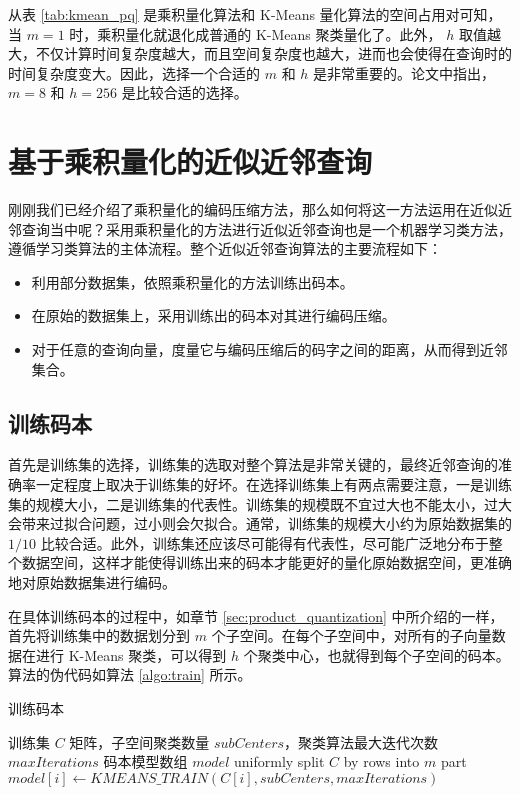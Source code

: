 从表 \ref{tab:kmean_pq} 是乘积量化算法和 K-Means 量化算法的空间占用对可知，当 $m = 1$ 时，乘积量化就退化成普通的 K-Means 聚类量化了。此外， $h$ 取值越大，不仅计算时间复杂度越大，而且空间复杂度也越大，进而也会使得在查询时的时间复杂度变大。因此，选择一个合适的 $m$ 和 $h$ 是非常重要的。论文\cite{Herve_PQ}中指出，$ m = 8 $ 和 $h = 256$ 是比较合适的选择。
\section{基于乘积量化的近似近邻查询}
刚刚我们已经介绍了乘积量化的编码压缩方法，那么如何将这一方法运用在近似近邻查询当中呢？采用乘积量化的方法进行近似近邻查询也是一个机器学习类方法，遵循学习类算法的主体流程。整个近似近邻查询算法的主要流程如下：
\begin{itemize}
\item 利用部分数据集，依照乘积量化的方法训练出码本。
\item 在原始的数据集上，采用训练出的码本对其进行编码压缩。
\item 对于任意的查询向量，度量它与编码压缩后的码字之间的距离，从而得到近邻集合。
\end{itemize}
\subsection{训练码本}
首先是训练集的选择，训练集的选取对整个算法是非常关键的，最终近邻查询的准确率一定程度上取决于训练集的好坏。在选择训练集上有两点需要注意，一是训练集的规模大小，二是训练集的代表性。训练集的规模既不宜过大也不能太小，过大会带来过拟合问题，过小则会欠拟合。通常，训练集的规模大小约为原始数据集的 $1/10$ 比较合适。此外，训练集还应该尽可能得有代表性，尽可能广泛地分布于整个数据空间，这样才能使得训练出来的码本才能更好的量化原始数据空间，更准确地对原始数据集进行编码。

在具体训练码本的过程中，如章节 \ref{sec:product_quantization} 中所介绍的一样，首先将训练集中的数据划分到 $m$ 个子空间。在每个子空间中，对所有的子向量数据在进行 K-Means 聚类，可以得到 $h$ 个聚类中心，也就得到每个子空间的码本。算法的伪代码如算法 \ref{algo:train} 所示。
\begin{algorithm}
    \caption{训练码本}
    \label{algo:train}
    \begin{algorithmic}[1] %
        \Require 训练集 $C$ 矩阵，子空间聚类数量 $subCenters$，聚类算法最大迭代次数 $maxIterations$
        \Ensure 码本模型数组 $model$
            \State uniformly split $C$ by rows into $m$ part
                \State $model[i] \gets KMEANS\_TRAIN(C[i], subCenters, maxIterations)$
            \EndFor
            \State {}
        \EndFunction
    \end{algorithmic}
\end{algorithm}
